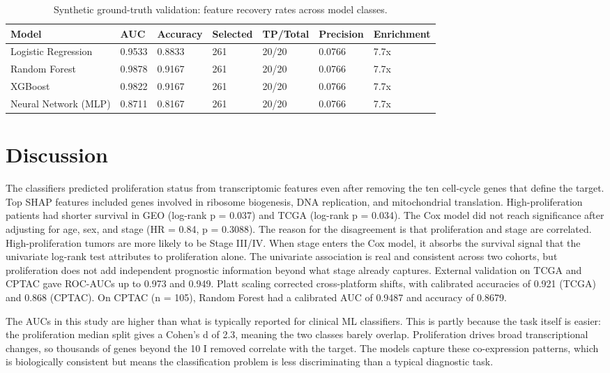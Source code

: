 \documentclass[11pt]{article}
\begin{document}
\begin{table}[H]
\centering
\caption{Synthetic ground-truth validation: feature recovery rates across model classes.}
\begin{tabular}{lllllll}
\toprule
\textbf{Model} & \textbf{AUC} & \textbf{Accuracy} & \textbf{Selected} & \textbf{TP/Total} & \textbf{Precision} & \textbf{Enrichment} \\
\midrule
  Logistic Regression & 0.9533 & 0.8833 & 261 & 20/20 & 0.0766 & 7.7x \\
  Random Forest & 0.9878 & 0.9167 & 261 & 20/20 & 0.0766 & 7.7x \\
  XGBoost & 0.9822 & 0.9167 & 261 & 20/20 & 0.0766 & 7.7x \\
  Neural Network (MLP) & 0.8711 & 0.8167 & 261 & 20/20 & 0.0766 & 7.7x \\
\bottomrule
\end{tabular}
\end{table}

\section{Discussion}
The classifiers predicted proliferation status from transcriptomic features even after removing the ten cell-cycle genes that define the target. Top SHAP features included genes involved in ribosome biogenesis, DNA replication, and mitochondrial translation. High-proliferation patients had shorter survival in GEO (log-rank p = 0.037) and TCGA (log-rank p = 0.034). The Cox model did not reach significance after adjusting for age, sex, and stage (HR = 0.84, p = 0.3088). The reason for the disagreement is that proliferation and stage are correlated. High-proliferation tumors are more likely to be Stage III/IV. When stage enters the Cox model, it absorbs the survival signal that the univariate log-rank test attributes to proliferation alone. The univariate association is real and consistent across two cohorts, but proliferation does not add independent prognostic information beyond what stage already captures. External validation on TCGA and CPTAC gave ROC-AUCs up to 0.973 and 0.949. Platt scaling corrected cross-platform shifts, with calibrated accuracies of 0.921 (TCGA) and 0.868 (CPTAC). On CPTAC (n = 105), Random Forest had a calibrated AUC of 0.9487 and accuracy of 0.8679.

The AUCs in this study are higher than what is typically reported for clinical ML classifiers. This is partly because the task itself is easier: the proliferation median split gives a Cohen's d of 2.3, meaning the two classes barely overlap. Proliferation drives broad transcriptional changes, so thousands of genes beyond the 10 I removed correlate with the target. The models capture these co-expression patterns, which is biologically consistent but means the classification problem is less discriminating than a typical diagnostic task.
\end{document}
